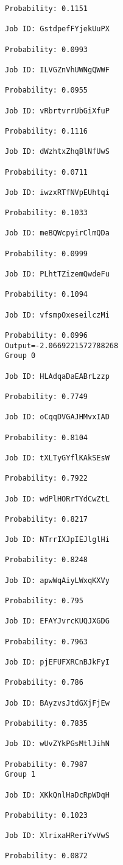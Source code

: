 \documentclass[11pt]{article}
\begin{document}
\begin{Verbatim}[commandchars=\\\{\}]
Probability: 0.1151

Job ID: GstdpefFYjekUuPX

Probability: 0.0993

Job ID: ILVGZnVhUWNgQWWF

Probability: 0.0955

Job ID: vRbrtvrrUbGiXfuP

Probability: 0.1116

Job ID: dWzhtxZhqBlNfUwS

Probability: 0.0711

Job ID: iwzxRTfNVpEUhtqi

Probability: 0.1033

Job ID: meBQWcpyirClmQDa

Probability: 0.0999

Job ID: PLhtTZizemQwdeFu

Probability: 0.1094

Job ID: vfsmpOxeseilczMi

Probability: 0.0996
Output=-2.0669221572788268
Group 0

Job ID: HLAdqaDaEABrLzzp

Probability: 0.7749

Job ID: oCqqDVGAJHMvxIAD

Probability: 0.8104

Job ID: tXLTyGYflKAkSEsW

Probability: 0.7922

Job ID: wdPlHORrTYdCwZtL

Probability: 0.8217

Job ID: NTrrIXJpIEJlglHi

Probability: 0.8248

Job ID: apwWqAiyLWxqKXVy

Probability: 0.795

Job ID: EFAYJvrcKUQJXGDG

Probability: 0.7963

Job ID: pjEFUFXRCnBJkFyI

Probability: 0.786

Job ID: BAyzvsJtdGXjFjEw

Probability: 0.7835

Job ID: wUvZYkPGsMtlJihN

Probability: 0.7987
Group 1

Job ID: XKkQnlHaDcRpWDqH

Probability: 0.1023

Job ID: XlrixaHReriYvVwS

Probability: 0.0872


\end{Verbatim}
\end{document}
